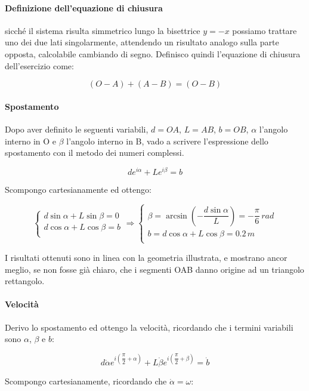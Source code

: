 \documentclass[main.tex]{subfiles}
\begin{document}
\paragraph{Definizione dell'equazione di chiusura} sicché il sistema risulta simmetrico lungo la bisettrice $y = -x$ possiamo trattare uno dei due lati singolarmente, attendendo un risultato analogo sulla parte opposta, calcolabile cambiando di segno. Definisco quindi l'equazione di chiusura dell'esercizio come:

\[
	(O-A) + (A-B) = (O-B)
\]

\paragraph{Spostamento} Dopo aver definito le seguenti variabili, $d = OA$, $L = AB$, $b = OB$, $\alpha$ l'angolo interno in O e $\beta$ l'angolo interno in B, vado a scrivere l'espressione dello spostamento con il metodo dei numeri complessi.

\[
	de^{i\alpha} + Le^{i\beta} = b
\]

Scompongo cartesianamente ed ottengo:

\[
	\begin{cases}
		d\sin\alpha + L\sin\beta = 0\\
		d\cos\alpha + L\cos\beta = b\\
	\end{cases}
	\Longrightarrow
	\begin{cases}
		\beta = \arcsin\left (-\dfrac{d\sin\alpha}{L}\right ) = -\dfrac{\pi}{6}\,rad\\
		b = d\cos\alpha + L\cos\beta = 0.2\,m\\
	\end{cases}
\]

I risultati ottenuti sono in linea con la geometria illustrata, e mostrano ancor meglio, se non fosse già chiaro, che i segmenti OAB danno origine ad un triangolo rettangolo.

\paragraph{Velocità} Derivo lo spostamento ed ottengo la velocità, ricordando che i termini variabili sono $\alpha$, $\beta$ e $b$:

\[
	d\dot{\alpha}e^{i \left (\dfrac{\pi}{2} + \alpha\right )} + L\dot{\beta}e^{i \left (\dfrac{\pi}{2} + \beta\right )} = \dot{b}
\]

Scompongo cartesianamente, ricordando che $\dot{\alpha} = \omega$:
\end{document}
